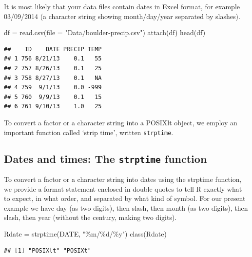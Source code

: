 \documentclass[
]{book}
\newenvironment{Shaded}{\begin{snugshade}}{\end{snugshade}}
\newcommand{\AttributeTok}[1]{\textcolor[rgb]{0.77,0.63,0.00}{#1}}
\newcommand{\FunctionTok}[1]{\textcolor[rgb]{0.00,0.00,0.00}{#1}}
\newcommand{\NormalTok}[1]{#1}
\newcommand{\OtherTok}[1]{\textcolor[rgb]{0.56,0.35,0.01}{#1}}
\newcommand{\StringTok}[1]{\textcolor[rgb]{0.31,0.60,0.02}{#1}}
\begin{document}
It is most likely that your data files contain dates in Excel format, for example 03/09/2014 (a character string showing month/day/year separated by slashes).

\begin{Shaded}
\begin{Highlighting}[]
\NormalTok{df }\OtherTok{=} \FunctionTok{read.csv}\NormalTok{(}\AttributeTok{file =} \StringTok{"Data/boulder{-}precip.csv"}\NormalTok{)}
\FunctionTok{attach}\NormalTok{(df)}
\FunctionTok{head}\NormalTok{(df)}
\end{Highlighting}
\end{Shaded}

\begin{verbatim}
##    ID    DATE PRECIP TEMP
## 1 756 8/21/13    0.1   55
## 2 757 8/26/13    0.1   25
## 3 758 8/27/13    0.1   NA
## 4 759  9/1/13    0.0 -999
## 5 760  9/9/13    0.1   15
## 6 761 9/10/13    1.0   25
\end{verbatim}

To convert a factor or a character string into a POSIXlt object, we employ an important function called `strip time', written \texttt{strptime}.

\hypertarget{dates-and-times-the-strptime-function}{%
\subsection{\texorpdfstring{Dates and times: The \texttt{strptime} function}{Dates and times: The strptime function}}\label{dates-and-times-the-strptime-function}}

To convert a factor or a character string into dates using the strptime function, we provide a format statement enclosed in double quotes to tell R exactly what to expect, in what order, and separated by what kind of symbol. For our present example we have day (as two digits), then slash, then month (as two digits), then slash, then year (without the century, making two digits).

\begin{Shaded}
\begin{Highlighting}[]
\NormalTok{Rdate }\OtherTok{=} \FunctionTok{strptime}\NormalTok{(DATE, }\StringTok{"\%m/\%d/\%y"}\NormalTok{)}
\FunctionTok{class}\NormalTok{(Rdate)}
\end{Highlighting}
\end{Shaded}

\begin{verbatim}
## [1] "POSIXlt" "POSIXt"
\end{verbatim}
\end{document}
